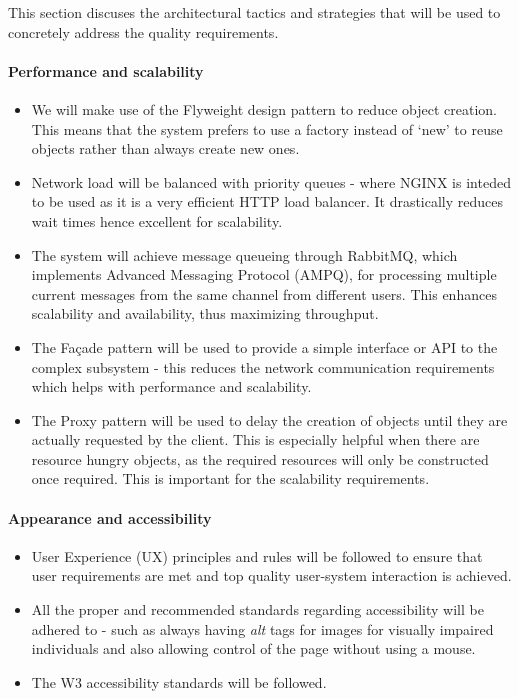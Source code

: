 This section discuses the architectural tactics and strategies that will be used to concretely address the quality requirements.

\paragraph{Performance and scalability}
\begin{itemize}
	\item We will make use of the Flyweight design pattern to reduce object creation. This means that the system prefers to use a factory instead of `new' to reuse objects rather than always create new ones. 
	\item Network load will be balanced with priority queues - where NGINX is inteded to 	be used as it is a very efficient HTTP load balancer. It drastically reduces wait 			times hence excellent for scalability.
	
	\item The system will achieve message queueing through RabbitMQ, which implements 		Advanced Messaging Protocol (AMPQ), for processing multiple current messages from the 	same channel from different users. This enhances scalability and availability, thus 		maximizing throughput.
	
	\item The Façade pattern will be used to provide a simple interface or API to the complex subsystem - this reduces the network communication requirements which helps with performance and scalability.
	\item The Proxy pattern will be used to delay the creation of objects until they are actually requested by the client. This is especially helpful when there are resource hungry objects, as the required resources will only be constructed once required. This is important for the scalability requirements.
\end{itemize}

\paragraph{Appearance and accessibility}
\begin{itemize}
	\item User Experience (UX) principles and rules will be followed to ensure that user requirements are met and top quality user-system  interaction is achieved.
	\item All the proper and recommended standards regarding accessibility will be adhered to - such as always having \textit{alt} tags for images for visually impaired individuals and also allowing control of the page without using a mouse.
	\item The W3 accessibility standards will be followed.
\end{itemize}

